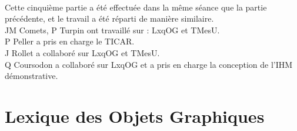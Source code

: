 \documentclass{report}
\begin{document}
\paragraph{}
Cette cinquième partie a été effectuée dans la même séance que la partie précédente, et le travail a été réparti de manière similaire.\\

JM Comets, P Turpin ont travaillé sur : LxqOG et TMesU.\\

P Peller a pris en charge le TICAR.\\

J Rollet a collaboré sur LxqOG et TMesU.\\

Q Coursodon a collaboré sur LxqOG et a pris en charge la conception de l'IHM démonstrative.\\ 



\section{Lexique des Objets Graphiques}
\end{document}
